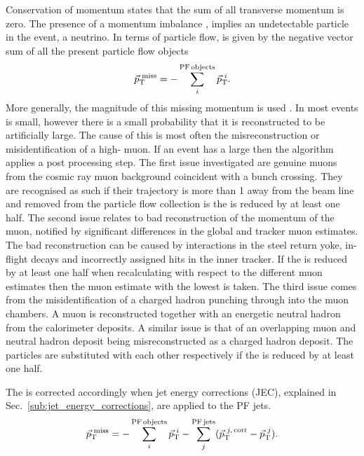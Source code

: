 Conservation of momentum states that the sum of all transverse momentum is zero.
The presence of a momentum imbalance \ptmissvec{}, implies an undetectable particle in the event, \eg{} a neutrino.
In terms of particle flow, \ptmissvec{} is given by the negative vector sum of all the present particle flow objects
\begin{equation*}
	{\vec{p}_{\mathrm{T}}}^{\,\,\mathrm{miss}} = - \sum_{i}^{\mathrm{PF\,objects}} \vec{p}_{\mathrm{T}}^{\,\,i}.
\end{equation*}
More generally, the magnitude of this missing momentum is used \ptmiss{}. 
In most events \ptmiss{} is small, however there is a small probability that it is reconstructed to be artificially large.
The cause of this is most often the misreconstruction or misidentification of a high-\pt{} muon.
If an event has a large \ptmiss{} then the \PF{} algorithm applies a post processing step.
The first issue investigated are genuine muons from the cosmic ray muon background coincident with a bunch crossing.
They are recognised as such if their trajectory is more than 1\cm{} away from the beam line and removed from the particle flow collection is the \ptmiss{} is reduced by at least one half.
The second issue relates to bad reconstruction of the momentum of the muon, notified by significant differences in the global and tracker muon \pt{} estimates.
The bad reconstruction can be caused by interactions in the steel return yoke, in-flight decays and incorrectly assigned hits in the inner tracker.
If the \ptmiss{} is reduced by at least one half when recalculating with respect to the different muon \pt{} estimates then the muon estimate with the lowest \ptmiss{} is taken.
The third issue comes from the misidentification of a charged hadron punching through into the muon chambers.
A muon is reconstructed together with an energetic neutral hadron from the calorimeter deposits.
A similar issue is that of an overlapping muon and neutral hadron deposit being misreconstructed as a charged hadron deposit.
The particles are substituted with each other respectively if the \ptmiss{} is reduced by at least one half.

The \ptmiss{} is corrected accordingly when jet energy corrections (JEC), explained in Sec.~\ref{sub:jet_energy_corrections}, are applied to the PF jets.
\begin{equation*}
		{\vec{p}_{\mathrm{T}}}^{\,\,\mathrm{miss}} = - \sum_{i}^{\mathrm{PF\,objects}}{\vec{p}_{\mathrm{T}}^{\,\,i}} - \sum_{j}^{\mathrm{PF\,jets}}({\vec{p}_{\mathrm{T}}^{\,\,j,\,\mathrm{corr}}-\vec{p}_{\mathrm{T}}^{\,\,j})}.
\end{equation*}



